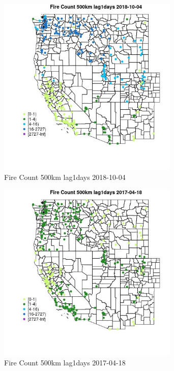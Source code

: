 \begin{figure} 
\centering  
\includegraphics[width=0.77\textwidth]{Code_Outputs/Report_ML_input_PM25_Step4_part_f_de_duplicated_aves_prioritize_24hr_obswNAs_MapObsFire_Count_500km_lag1days2018-10-04.jpg} 
\caption{\label{fig:Report_ML_input_PM25_Step4_part_f_de_duplicated_aves_prioritize_24hr_obswNAsMapObsFire_Count_500km_lag1days2018-10-04}Fire Count 500km lag1days 2018-10-04} 
\end{figure} 
 

\begin{figure} 
\centering  
\includegraphics[width=0.77\textwidth]{Code_Outputs/Report_ML_input_PM25_Step4_part_f_de_duplicated_aves_prioritize_24hr_obswNAs_MapObsFire_Count_500km_lag1days2017-04-18.jpg} 
\caption{\label{fig:Report_ML_input_PM25_Step4_part_f_de_duplicated_aves_prioritize_24hr_obswNAsMapObsFire_Count_500km_lag1days2017-04-18}Fire Count 500km lag1days 2017-04-18} 
\end{figure} 
 

